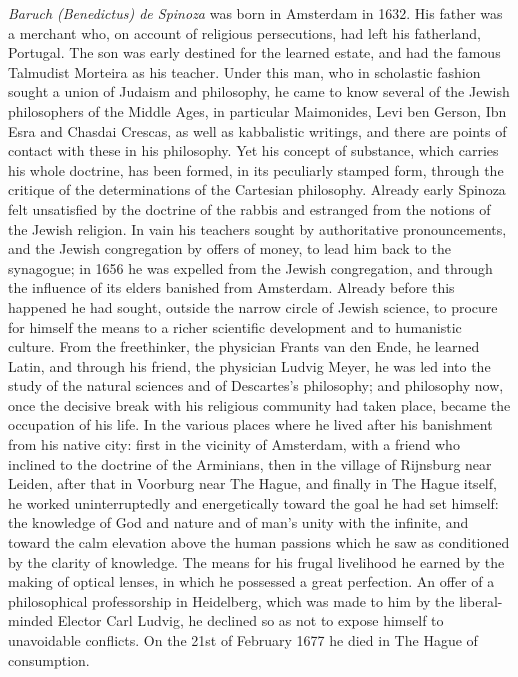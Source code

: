 \emph{Baruch (Benedictus) de Spinoza} was born in Amsterdam in 1632. His
father was a merchant who, on account of religious persecutions, had
left his fatherland, Portugal. The son was early destined for the
learned estate, and had the famous Talmudist Morteira as his teacher.
Under this man, who in scholastic fashion sought a union of Judaism and
philosophy, he came to know several of the Jewish philosophers of the
Middle Ages, in particular Maimonides, Levi ben Gerson, Ibn Esra and
Chasdai Crescas, as well as kabbalistic writings, and there are points
of contact with these in his philosophy. Yet his concept of substance,
which carries his whole doctrine, has been formed, in its peculiarly
stamped form, through the critique of the determinations of the
Cartesian philosophy. Already early Spinoza felt unsatisfied by the
doctrine of the rabbis and estranged from the notions of the Jewish
religion. In vain his teachers sought by authoritative pronouncements,
and the Jewish congregation by offers of money, to lead him back to the
synagogue; in 1656 he was expelled from the Jewish congregation, and
through the influence of its elders banished from Amsterdam. Already
before this happened he had sought, outside the narrow circle of Jewish
science, to procure for himself the means to a richer scientific
development and to humanistic culture. From the freethinker, the
physician Frants van den Ende, he learned Latin, and through his friend,
the physician Ludvig Meyer, he was led into the study of the natural
sciences and of Descartes's philosophy; and philosophy now, once the
decisive break with his religious community had taken place, became the
occupation of his life. In the various places where he lived
after his banishment from his native city: first in the
vicinity of Amsterdam, with a friend who inclined to the doctrine of the
Arminians, then in the village of Rijnsburg near Leiden, after that in
Voorburg near The Hague, and finally in The Hague itself, he worked
uninterruptedly and energetically toward the goal he had set himself:
the knowledge of God and nature and of man's unity with the infinite,
and toward the calm elevation above the human passions which he saw as
conditioned by the clarity of knowledge. The means for his frugal
livelihood he earned by the making of optical lenses, in which he
possessed a great perfection. An offer of a philosophical professorship
in Heidelberg, which was made to him by the liberal-minded Elector Carl
Ludvig, he declined so as not to expose himself to unavoidable
conflicts. On the 21st of February 1677 he died in The Hague of
consumption.


